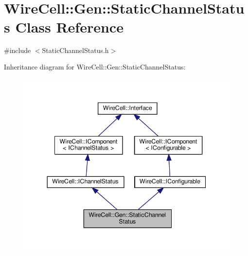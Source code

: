 \hypertarget{class_wire_cell_1_1_gen_1_1_static_channel_status}{}\section{Wire\+Cell\+:\+:Gen\+:\+:Static\+Channel\+Status Class Reference}
\label{class_wire_cell_1_1_gen_1_1_static_channel_status}


{\ttfamily \#include $<$Static\+Channel\+Status.\+h$>$}



Inheritance diagram for Wire\+Cell\+:\+:Gen\+:\+:Static\+Channel\+Status\+:
\nopagebreak
\begin{figure}[H]
\begin{center}
\leavevmode
\includegraphics[width=344pt]{class_wire_cell_1_1_gen_1_1_static_channel_status__inherit__graph}
\end{center}
\end{figure}



